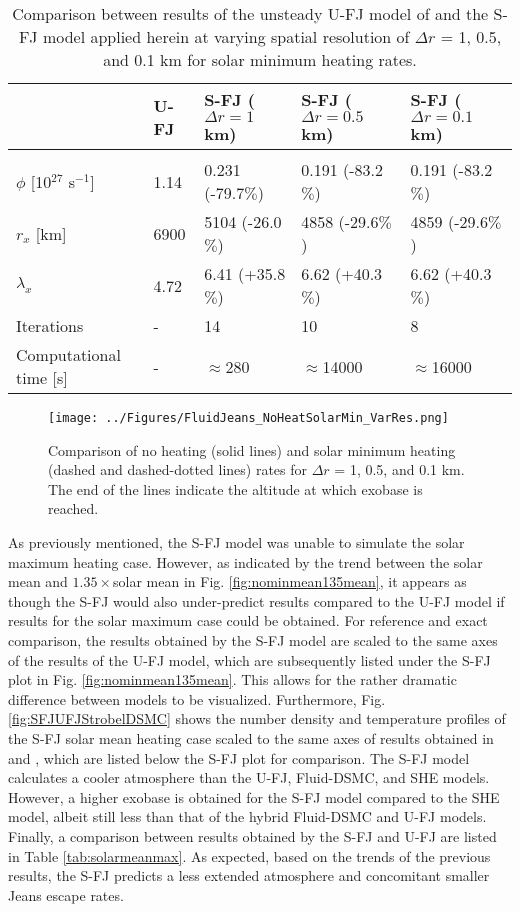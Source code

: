 \documentclass[times,12]{article}
\begin{document}
\begin{table}[h!]
\centering
\caption{Comparison between results of the unsteady U-FJ model of \cite{Erwin2013} and the S-FJ model applied herein at varying spatial resolution of $\Delta r$ = 1, 0.5, and 0.1 km for solar minimum heating rates.}
\begin{tabular}{lllll}
\hline
& U-FJ & S-FJ ($\Delta r = 1$ km) & S-FJ ($\Delta r = 0.5$ km) & S-FJ ($\Delta r = 0.1$ km)\\
\hline \vspace{-0.1in}\\
$\phi$ [10$^{27}$ s$^{-1}$] & 1.14 & 0.231 (-79.7$\%$) & 0.191 (-83.2$\%$) & 0.191 (-83.2$\%$) \\
$r_x$ [km] & 6900 & 5104 (-26.0$\%$) & 4858 (-29.6$\%$) & 4859 (-29.6$\%$)\\
$\lambda_x$ & 4.72 & 6.41 (+35.8$\%$) & 6.62 (+40.3$\%$) & 6.62 (+40.3$\%$)\\
Iterations & - & 14 & 10 & 8 \\
Computational time [s] & - & $\approx$280 & $\approx$14000 & $\approx$16000 \\
\hline
\end{tabular}
\label{tab:solarmin}
\end{table}
\begin{figure}[h!]
\centering
\texttt{[image: ../Figures/FluidJeans\_NoHeatSolarMin\_VarRes.png]}
\caption{Comparison of no heating (solid lines) and solar minimum heating (dashed and dashed-dotted lines) rates for $\Delta r$ = 1, 0.5, and 0.1 km. The end of the lines indicate the altitude at which exobase is reached.}
\label{fig:varres}
\end{figure}
\indent As previously mentioned, the S-FJ model was unable to simulate the solar maximum heating case. However, as indicated by the trend between the solar mean and $1.35\times$solar mean in Fig. \ref{fig:nominmean135mean}, it appears as though the S-FJ would also under-predict results compared to the U-FJ model if results for the solar maximum case could be obtained. For reference and exact comparison, the results obtained by the S-FJ model are scaled to the same axes of the results of the U-FJ model, which are subsequently listed under the S-FJ plot in Fig. \ref{fig:nominmean135mean}. This allows for the rather dramatic difference between models to be visualized. Furthermore, Fig. \ref{fig:SFJUFJStrobelDSMC} shows the number density and temperature profiles of the S-FJ solar mean heating case scaled to the same axes of results obtained in \cite{Erwin2013} and \cite{Strobel2008}, which are listed below the S-FJ plot for comparison. The S-FJ model calculates a cooler atmosphere than the U-FJ, Fluid-DSMC, and SHE models. However, a higher exobase is obtained for the S-FJ model compared to the SHE model, albeit still less than that of the hybrid Fluid-DSMC and U-FJ models. Finally, a comparison between results obtained by the S-FJ and U-FJ are listed in Table \ref{tab:solarmeanmax}. As expected, based on the trends of the previous results, the S-FJ predicts a less extended atmosphere and concomitant smaller Jeans escape rates. \\
\end{document}
